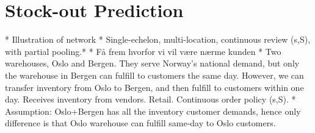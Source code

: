 \documentclass[../../main.tex]{subfiles}
\begin{document}

\section{Stock-out Prediction}

*	Illustration of network
*	Single-echelon, multi-location, continuous review (s,S), with partial pooling.*
*	Få frem hvorfor vi vil være nærme kunden
*	Two warehouses, Oslo and Bergen. They serve Norway’s national demand, but only the warehouse in Bergen can fulfill to customers the same day. However, we can transfer inventory from Oslo to Bergen, and then fulfill to customers within one day. Receives inventory from vendors. Retail. Continuous order policy (s,S). 
*	Assumption: Oslo+Bergen has all the inventory customer demands, hence only difference is that Oslo warehouse can fulfill same-day to Oslo customers.


\end{document}
